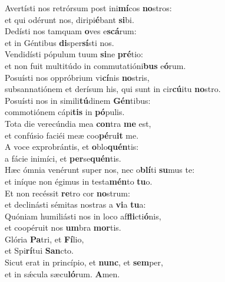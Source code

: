 \evenverse Avertísti nos retrórsum post ini\textbf{mí}cos \textbf{no}stros:~\*\\
\evenverse et qui odérunt nos, diripi\textbf{é}bant \textbf{si}bi.\\
\oddverse Dedísti nos tamquam \textbf{o}ves e\textbf{scá}rum:~\*\\
\oddverse et in Géntibus \textbf{di}sper\textbf{sí}sti nos.\\
\evenverse Vendidísti pópulum tuum \textbf{si}ne \textbf{pré}tio:~\*\\
\evenverse et non fuit multitúdo in commutatióni\textbf{bus} e\textbf{ó}rum.\\
\oddverse Posuísti nos oppróbrium vi\textbf{cí}nis \textbf{no}stris,~\*\\
\oddverse subsannatiónem et derísum his, qui sunt in cir\textbf{cú}itu \textbf{no}stro.\\
\evenverse Posuísti nos in simili\textbf{tú}dinem \textbf{Gén}tibus:~\*\\
\evenverse commotiónem cápi\textbf{tis} in \textbf{pó}pulis.\\
\oddverse Tota die verecúndia mea \textbf{con}tra \textbf{me} est,~\*\\
\oddverse et confúsio faciéi meæ coo\textbf{pé}ru\textbf{it} me.\\
\evenverse A voce exprobrántis, et \textbf{o}blo\textbf{quén}tis:~\*\\
\evenverse a fácie inimíci, et \textbf{per}se\textbf{quén}tis.\\
\oddverse Hæc ómnia venérunt super nos, nec o\textbf{blí}ti \textbf{su}mus te:~\*\\
\oddverse et iníque non égimus in testa\textbf{mén}to \textbf{tu}o.\\
\evenverse Et non recéssit \textbf{re}tro cor \textbf{no}strum:~\*\\
\evenverse et declinásti sémitas nostras a \textbf{vi}a \textbf{tu}a:\\
\oddverse Quóniam humiliásti nos in loco af\textbf{fli}cti\textbf{ó}nis,~\*\\
\oddverse et coopéruit nos \textbf{um}bra \textbf{mor}tis.\\
\evenverse Glória \textbf{Pa}tri, et \textbf{Fí}lio,~\*\\
\evenverse et Spi\textbf{rí}tui \textbf{San}cto.\\
\oddverse Sicut erat in princípio, et \textbf{nunc}, et \textbf{sem}per,~\*\\
\oddverse et in sǽcula sæcu\textbf{ló}rum. \textbf{A}men.\\
